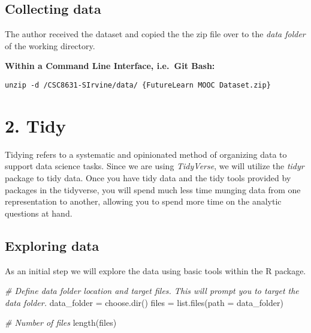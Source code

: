 \documentclass[
]{article}
\newenvironment{Shaded}{\begin{snugshade}}{\end{snugshade}}
\newcommand{\AttributeTok}[1]{\textcolor[rgb]{0.77,0.63,0.00}{#1}}
\newcommand{\CommentTok}[1]{\textcolor[rgb]{0.56,0.35,0.01}{\textit{#1}}}
\newcommand{\FunctionTok}[1]{\textcolor[rgb]{0.00,0.00,0.00}{#1}}
\newcommand{\NormalTok}[1]{#1}
\newcommand{\OtherTok}[1]{\textcolor[rgb]{0.56,0.35,0.01}{#1}}
\begin{document}
\hypertarget{collecting-data}{%
\subsection{Collecting data}\label{collecting-data}}

The author received the dataset and copied the the zip file over to the
\emph{data folder} of the working directory.

\textbf{Within a Command Line Interface, i.e.~Git Bash:}

\begin{verbatim}
unzip -d /CSC8631-SIrvine/data/ {FutureLearn MOOC Dataset.zip}
\end{verbatim}

\newpage

\hypertarget{tidy}{%
\section{2. Tidy}\label{tidy}}

Tidying refers to a systematic and opinionated method of organizing data
to support data science tasks. Since we are using \emph{TidyVerse}, we
will utilize the \emph{tidyr} package to tidy data. Once you have tidy
data and the tidy tools provided by packages in the tidyverse, you will
spend much less time munging data from one representation to another,
allowing you to spend more time on the analytic questions at hand.

\hypertarget{exploring-data}{%
\subsection{Exploring data}\label{exploring-data}}

As an initial step we will explore the data using basic tools within the
R package.

\begin{Shaded}
\begin{Highlighting}[]
\CommentTok{\# Define data folder location and target files. This will prompt you to target the data folder.}
\NormalTok{data\_folder }\OtherTok{=} \FunctionTok{choose.dir}\NormalTok{()}
\NormalTok{files }\OtherTok{=} \FunctionTok{list.files}\NormalTok{(}\AttributeTok{path =}\NormalTok{ data\_folder)}

\CommentTok{\# Number of files}
\FunctionTok{length}\NormalTok{(files)}
\end{Highlighting}
\end{Shaded}
\end{document}
